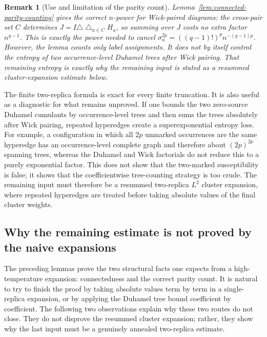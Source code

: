 \documentclass[11pt]{article}
\newtheorem{remark}[theorem]{Remark}
\begin{document}
\begin{remark}[Use and limitation of the parity count]
  Lemma~\ref{lem:connected-parity-counting} gives the correct $n$-power for
  Wick-paired diagrams: the cross-pair set $C$ determines
  $J=I\triangle\bigtriangleup_{a\in C}H_a$, so summing over $J$ costs no extra
  factor $n^{q-1}$.  This is exactly the power needed to cancel
  $\sigma_n^{2p}=((q-1)!)^p n^{-(q-1)p}$.  However, the lemma counts only label
  assignments.  It does not by itself control the entropy of two occurrence-level
  Duhamel trees after Wick pairing.  That remaining entropy is exactly why the remaining input is stated as a
  resummed cluster-expansion estimate below.
\end{remark}

The finite two-replica formula is exact for every finite truncation.  It is also
useful as a diagnostic for what remains unproved.  If one bounds the two
zero-source Duhamel cumulants by occurrence-level trees and then sums the trees
absolutely after Wick pairing, repeated hyperedges create a superexponential
entropy loss.  For example, a configuration in which all $2p$ unmarked
occurrences are the same hyperedge has an occurrence-level complete graph and
therefore about $(2p)^{2p}$ spanning trees, whereas the Duhamel and Wick
factorials do not reduce this to a purely exponential factor.  This does not
show that the two-marked susceptibility is false; it shows that the
coefficientwise tree-counting strategy is too crude.  The remaining input must
therefore be a resummed two-replica $L^2$ cluster expansion, where repeated
hyperedges are treated before taking absolute values of the final cluster
weights.


\subsection{Why the remaining estimate is not proved by the naive expansions}
\label{subsec:why-naive-cluster-fails}

The preceding lemmas prove the two structural facts one expects from a
high-temperature expansion: connectedness and the correct parity count.  It is
natural to try to finish the proof by taking absolute values term by term in a
single-replica expansion, or by applying the Duhamel tree bound coefficient by
coefficient.  The following two observations explain why these two routes do
not close.  They do not disprove the resummed cluster expansion; rather, they
show why the last input must be a genuinely annealed two-replica estimate.
\end{document}
